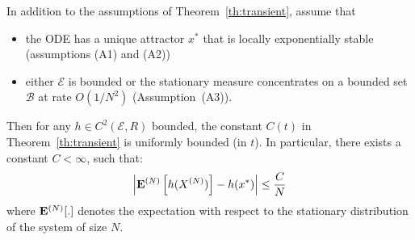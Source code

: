 \documentclass[acmlarge]{acmart}
\newcommand\XN{X^{(N)}}
\newcommand\E{\mathcal{E}}
\newcommand\calB{\mathcal{B}}
\newcommand\espN[1]{{\mathchoice{\bespN{#1}}{\sespN{#1}}{\sespN{#1}}{\sespN{#1}}}}
\newcommand\bespN[1]{\mathbf{E}^{(N)}\left[#1\right]}
\newcommand\sespN[1]{\mathbf{E}^{(N)}[#1]}
\newcommand\abs[1]{\left|#1\right|}
\begin{document}
\begin{theorem}
  \label{th:stationary}
  In addition to the assumptions of Theorem~\ref{th:transient}, assume
  that
  \begin{itemize}
  \item the ODE has a unique attractor $x^*$ that is locally
    exponentially stable (assumptions (A1) and (A2))
  \item either $\E$ is bounded or the stationary measure concentrates
    on a bounded set $\calB$ at rate $O(1/N^2)$ (Assumption~(A3)).
  \end{itemize}
  Then for any $h\in C^{2}(\E,R)$ bounded, the constant $C(t)$ in
  Theorem~\ref{th:transient} is uniformly bounded (in $t$). In
  particular, there exists a constant $C<\infty$, such that:
  \begin{align}
    \label{eq:th_stationary}
    \abs{\espN{h(\XN)}-h(x^*)} \le \frac{C}{N}
  \end{align}
  where $\espN{.}$ denotes the expectation with respect to the
  stationary distribution of the system of size $N$.
\end{theorem}
\end{document}

